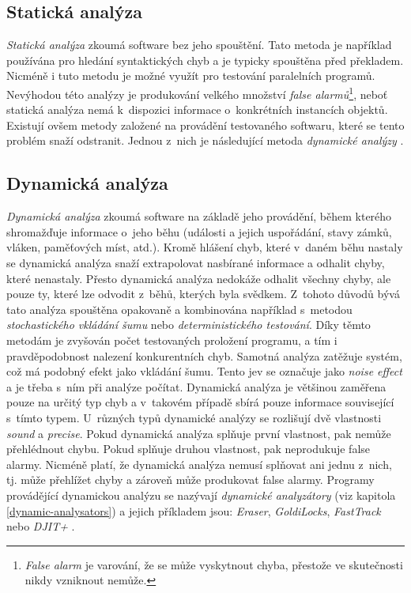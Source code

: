 \subsection{Statická analýza}

\textit{Statická analýza} zkoumá software bez jeho spouštění. Tato metoda je například používána pro hledání syntaktických chyb a je typicky spouštěna před překladem. Nicméně i tuto metodu je možné využít pro testování paralelních programů. Nevýhodou této analýzy je produkování velkého množství \textit{false alarmů}\footnote{\textit{False alarm} je varování, že se může vyskytnout chyba, přestože ve skutečnosti nikdy vzniknout nemůže.}, neboť statická analýza nemá k~dispozici informace o~konkrétních instancích objektů. Existují ovšem metody založené na provádění testovaného softwaru, které se tento problém snaží odstranit. Jednou z~nich je následující metoda \textit{dynamické analýzy} \cite{cite:advances}.

\subsection{Dynamická analýza}\label{dynamic-analysis}

\textit{Dynamická analýza} zkoumá software na základě jeho provádění, během kterého shromažďuje informace o~jeho běhu (události a jejich uspořádání, stavy zámků, vláken, paměťových míst, atd.). Kromě hlášení chyb, které v~daném běhu nastaly se dynamická analýza snaží extrapolovat nasbírané informace a odhalit chyby, které nenastaly. Přesto dynamická analýza nedokáže odhalit všechny chyby, ale pouze ty, které lze odvodit z~běhů, kterých byla svědkem. Z~tohoto důvodů bývá tato analýza spouštěna opakovaně a kombinována například s~metodou \textit{stochastického vkládání šumu} nebo \textit{deterministického testování}. Díky těmto metodám je zvyšován počet testovaných proložení programu, a tím i pravděpodobnost nalezení konkurentních chyb. Samotná analýza zatěžuje systém, což má podobný efekt jako vkládání šumu. Tento jev se označuje jako \textit{noise effect} a je třeba s~ním při analýze počítat. Dynamická analýza je většinou zaměřena pouze na určitý typ chyb a v~takovém případě sbírá pouze informace související s~tímto typem. U~různých typů dynamické analýzy se rozlišují dvě vlastnosti \textit{sound} a \textit{precise}. Pokud dynamická analýza splňuje první vlastnost, pak nemůže přehlédnout chybu. Pokud splňuje druhou vlastnost, pak neprodukuje false alarmy. Nicméně platí, že dynamická analýza nemusí splňovat ani jednu z~nich, tj. může přehlížet chyby a zároveň může produkovat false alarmy. Programy provádějící dynamickou analýzu se nazývají \textit{dynamické analyzátory} (viz kapitola \ref{dynamic-analysators}) a jejich příkladem jsou: \textit{Eraser}, \textit{GoldiLocks}, \textit{FastTrack} nebo \textit{DJIT+} \cite{cite:advances,cite:eraser,cite:ft,cite:rr}.


